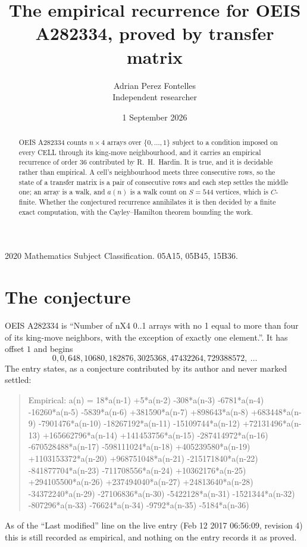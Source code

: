 \documentclass[11pt,a4paper]{article}
\title{The empirical recurrence for OEIS A282334, proved by transfer matrix}
\author{Adrian Perez Fontelles\\ \small Independent researcher}
\date{1 September 2026}
\theoremstyle{plain}
\theoremstyle{definition}
\begin{document}
\maketitle

\begin{abstract}
OEIS A282334 counts $n\times4$ arrays over $\{0,\dots,1\}$ subject to a condition imposed on
every CELL through its king-move neighbourhood, and it carries an empirical recurrence of
order $36$ contributed by R.~H.~Hardin. It is true, and it is decidable rather than
empirical. A cell's neighbourhood meets three consecutive rows, so the state of a transfer
matrix is a pair of consecutive rows and each step settles the middle one; an array is a
walk, and $a(n)$ is a walk count on $S=544$ vertices, which is $C$-finite. Whether the
conjectured recurrence annihilates it is then decided by a finite exact computation, with the
Cayley--Hamilton theorem bounding the work.
\end{abstract}

\noindent\small 2020 Mathematics Subject Classification. 05A15, 05B45, 15B36.\normalsize

\section{The conjecture}

OEIS A282334 is ``Number of nX4 0..1 arrays with no 1 equal to more than four of its king-move neighbors, with the exception of exactly one element.''. It has offset $1$ and begins
\[
0, 0, 648, 10680, 182876, 3025368, 47432264, 729388572,\ \dots
\]
The entry states, as a conjecture contributed by its author and never marked settled:
\begin{quote}
Empirical: a(n) = 18*a(n-1) +5*a(n-2) -308*a(n-3) -6781*a(n-4) -16260*a(n-5) -5839*a(n-6) +381590*a(n-7) +898643*a(n-8) +683448*a(n-9) -7901476*a(n-10) -18267192*a(n-11) -15109744*a(n-12) +72131496*a(n-13) +165662796*a(n-14) +141453756*a(n-15) -287414972*a(n-16) -670528488*a(n-17) -598111024*a(n-18) +405239580*a(n-19) +1103153372*a(n-20) +968751048*a(n-21) -215171840*a(n-22) -841877704*a(n-23) -711708556*a(n-24) +10362176*a(n-25) +294105500*a(n-26) +237494040*a(n-27) +24813640*a(n-28) -34372240*a(n-29) -27106836*a(n-30) -5422128*a(n-31) -1521344*a(n-32) -807296*a(n-33) -76624*a(n-34) -9792*a(n-35) -5184*a(n-36)
\end{quote}
As of the ``Last modified'' line on the live entry (Feb 12 2017 06:56:09, revision 4) this is still
recorded as empirical, and nothing on the entry records it as proved.
\end{document}
